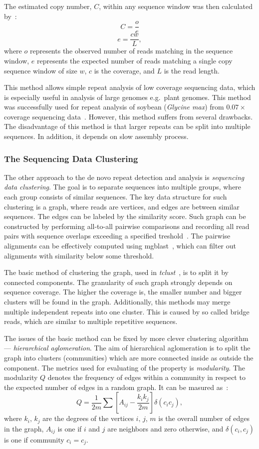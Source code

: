 The estimated copy number, $C$, within any sequence window was then calculated by~\cite{swaminathan2007global}:
$$C = \frac{o}{e}$$
$$e = \frac{cw}{L},$$
where $o$ represents the observed number of reads matching in the sequence window, $e$ represents the expected number of reads matching a single copy sequence window of size $w$, $c$ is the coverage, and $L$ is the read length.

This method allows simple repeat analysis of low coverage sequencing data, which is especially useful in analysis of large genomes e.g.\ plant genomes. This method was successfully used for repeat analysis of soybean (\textit{Glycine max}) from $0.07\times$ coverage sequencing data~\cite{swaminathan2007global}.
However, this method suffers from several drawbacks. The disadvantage of this method is that larger repeats can be split into multiple sequences. In addition, it depends on slow assembly process.

\subsubsection{The Sequencing Data Clustering}

The other approach to the de novo repeat detection and analysis is \emph{sequencing data clustering}. The goal is to separate sequences into multiple groups, where each group consists of similar sequences.
The key data structure for such clustering is a graph, where reads are vertices, and edges are between similar sequences. The edges can be labeled by the similarity score. Such graph can be constructed by performing all-to-all pairwise comparisons and recording all read pairs with sequence overlaps exceeding a specified treshold~\cite{pertea2003tigr, novak2010graph}. The pairwise alignments can be effectively computed using mgblast~\cite{pertea2003tigr}, which can filter out alignments with similarity below some threshold.

The basic method of clustering the graph, used in \emph{tclust}~\cite{pertea2003tigr}, is to split it by connected components. The granularity of such graph strongly depends on sequence coverage. The higher the coverage is, the smaller number and bigger clusters will be found in the graph. Additionally, this methods may merge multiple independent repeats into one cluster. This is caused by so called bridge reads, which are similar to multiple repetitive sequences.

The issues of the basic method can be fixed by more clever clustering algorithm --- \emph{hierarchical aglomeration}. The aim of hierarchical aglomeration is to split the graph into clusters (communities) which are more connected inside as outside the component. The metrics used for evaluating of the property is \emph{modularity}.
The modularity $Q$ denotes the frequency of edges within a community in respect to the expected number of edges in a random graph. It can be masured as~\cite{novak2010graph}:
$$Q = \frac{1}{2m}\sum\left[A_{ij}-\frac{k_i k_j}{2m}\right] \delta(c_i c_j),$$
where $k_i,\, k_j$ are the degrees of the vertices $i,\,j$, $m$ is the overall number of edges in the graph, $A_{ij}$ is one if $i$ and $j$ are neighbors and zero otherwise, and $\delta(c_i, c_j)$ is one if community $c_i = c_j$.

